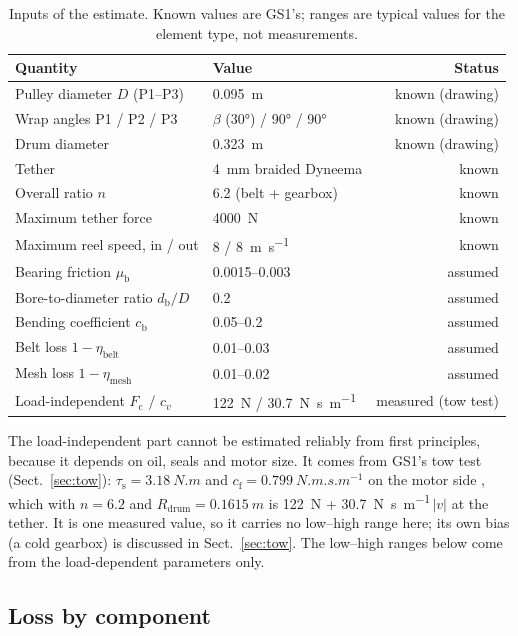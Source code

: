 \documentclass[11pt,a4paper]{article}
\begin{document}
\begin{table}[H]
\centering\small
\caption{Inputs of the estimate. Known values are GS1's; ranges are typical
values for the element type, not measurements.}
\label{tab:inputs}
\begin{tabular}{llr}
\toprule
Quantity & Value & Status \\
\midrule
Pulley diameter $D$ (P1--P3) & \SI{0.095}{m} & known (drawing) \\
Wrap angles P1 / P2 / P3 & $\beta$ (\ang{30}) / \ang{90} / \ang{90} & known (drawing) \\
Drum diameter & \SI{0.323}{m} & known (drawing) \\
Tether & \SI{4}{mm} braided Dyneema & known \\
Overall ratio $n$ & 6.2 (belt + gearbox) & known \cite{fechner2016} \\
Maximum tether force & \SI{4000}{N} & known \cite{fechner2016} \\
Maximum reel speed, in / out & 8 / \SI{8}{m.s^{-1}} & known \cite{fechner2016} \\
Bearing friction $\mu_\mathrm{b}$ & 0.0015--0.003 & assumed \\
Bore-to-diameter ratio $d_\mathrm{b}/D$ & 0.2 & assumed \\
Bending coefficient $c_\mathrm{b}$ & 0.05--0.2 & assumed \\
Belt loss $1-\eta_\mathrm{belt}$ & 0.01--0.03 & assumed \\
Mesh loss $1-\eta_\mathrm{mesh}$ & 0.01--0.02 & assumed \\
Load-independent $F_\mathrm{c}$ / $c_v$ & \SI{122}{N} / \SI{30.7}{N.s.m^{-1}} & measured (tow test) \\
\bottomrule
\end{tabular}
\end{table}

The load-independent part cannot be estimated reliably from first principles,
because it depends on oil, seals and motor size. It comes from GS1's tow test
(Sect.~\ref{sec:tow}): $\tau_\mathrm{s} = \SI{3.18}{N.m}$ and
$c_\mathrm{f} = \SI{0.799}{N.m.s.m^{-1}}$ on the motor side \cite{fechner2016},
which with $n = 6.2$ and $R_\mathrm{drum} = \SI{0.1615}{m}$ is
\SI{122}{N} + \SI{30.7}{N.s.m^{-1}}\,$|v|$ at the tether. It is one measured
value, so it carries no low--high range here; its own bias (a cold gearbox) is
discussed in Sect.~\ref{sec:tow}. The low--high ranges below come from the
load-dependent parameters only.

\subsection{Loss by component}
\end{document}
